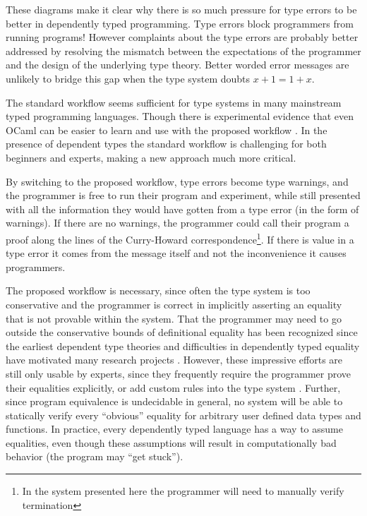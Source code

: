 These diagrams make it clear why there is so much pressure for type errors to be better in dependently typed programming\cite{eremondi2019framework}.
Type errors block programmers from running programs! However complaints about the type errors are probably better addressed by resolving the mismatch between the expectations of the programmer and the design of the underlying type theory.
Better worded error messages are unlikely to bridge this gap when the type system doubts $x+1=1+x$.

The standard workflow seems sufficient for type systems in many mainstream typed programming languages.
Though there is experimental evidence that even OCaml can be easier to learn and use with the proposed workflow \cite{10.1145/2951913.2951915}.
In the presence of dependent types the standard workflow is challenging for both beginners and experts, making a new approach much more critical.


By switching to the proposed workflow, type errors become type warnings, and the programmer is free to run their program and experiment, while still presented with all the information they would have gotten from a type error (in the form of warnings).
If there are no warnings, the programmer could call their program a proof along the lines of the Curry-Howard correspondence\footnote{
  In the system presented here the programmer will need to manually verify termination
}.
If there is value in a type error it comes from the message itself and not the inconvenience it causes programmers.

The proposed workflow is necessary, since often the type system is too conservative and the programmer is correct in implicitly asserting an equality that is not provable within the system.
That the programmer may need to go outside the conservative bounds of definitional equality has been recognized since the earliest dependent type theories \cite{Martin-Lof-1972} and difficulties in dependently typed equality have motivated many research projects \cite{HoTTbook,sjoberg2015programming,cockx2021taming}.
However, these impressive efforts are still only usable by experts, since they frequently require the programmer prove their equalities explicitly\cite{HoTTbook,sjoberg2015programming}, or add custom rules into the type system \cite{cockx2021taming}.
Further, since program equivalence is undecidable in general, no system will be able to statically verify every ``obvious'' equality for arbitrary user defined data types and functions.
In practice, every dependently typed language has a way to assume equalities, even though these assumptions will result in computationally bad behavior (the program may ``get stuck'').

